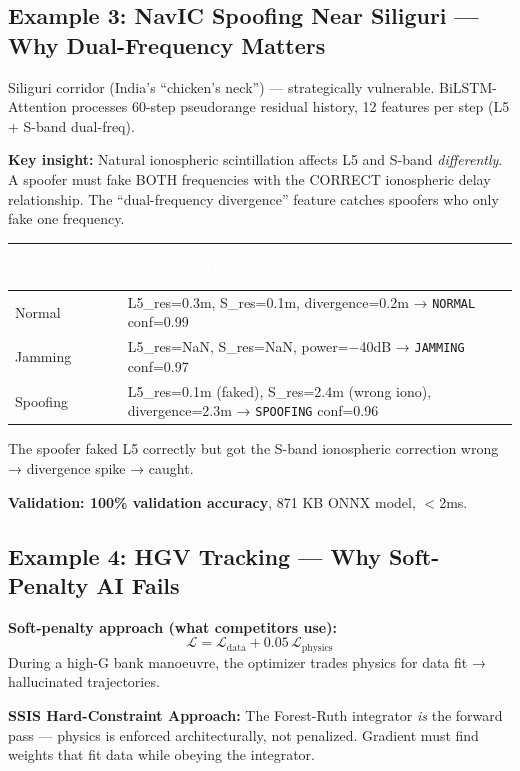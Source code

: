 \documentclass[11pt,a4paper]{article}
\newcommand{\TH}[1]{\textcolor{white}{\textbf{#1}}}
\begin{document}
\subsection{Example 3: NavIC Spoofing Near Siliguri --- Why Dual-Frequency Matters}

Siliguri corridor (India's ``chicken's neck'') --- strategically vulnerable. BiLSTM-Attention processes 60-step pseudorange residual history, 12 features per step (L5 + S-band dual-freq).

\textbf{Key insight:} Natural ionospheric scintillation affects L5 and S-band \emph{differently}. A spoofer must fake BOTH frequencies with the CORRECT ionospheric delay relationship. The ``dual-frequency divergence'' feature catches spoofers who only fake one frequency.

\begin{table}[H]\centering\small
\begin{tabularx}{\textwidth}{|p{3cm}|X|}
\hline
\rowcolor{dblue}\TH{Signal Condition} & \TH{SSIS Detection} \\
\hline
Normal & L5\_res=0.3m, S\_res=0.1m, divergence=0.2m → \texttt{NORMAL} conf=0.99 \\
\hline
Jamming & L5\_res=NaN, S\_res=NaN, power=$-$40dB → \texttt{JAMMING} conf=0.97 \\
\hline
Spoofing & L5\_res=0.1m (faked), S\_res=2.4m (wrong iono), divergence=2.3m → \texttt{SPOOFING} conf=0.96 \\
\hline
\end{tabularx}
\end{table}

The spoofer faked L5 correctly but got the S-band ionospheric correction wrong → divergence spike → caught.

\textbf{Validation: 100\% validation accuracy}, 871 KB ONNX model, $<$2ms.

\subsection{Example 4: HGV Tracking --- Why Soft-Penalty AI Fails}

\textbf{Soft-penalty approach (what competitors use):}
\[
\mathcal{L} = \mathcal{L}_\text{data} + 0.05\,\mathcal{L}_\text{physics}
\]
During a high-G bank manoeuvre, the optimizer trades physics for data fit → hallucinated trajectories.

\textbf{SSIS Hard-Constraint Approach:} The Forest-Ruth integrator \emph{is} the forward pass --- physics is enforced architecturally, not penalized. Gradient must find weights that fit data while obeying the integrator.
\end{document}
